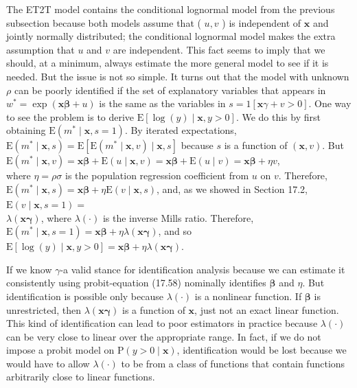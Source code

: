 \documentclass[10pt]{article}
\begin{document}
The ET2T model contains the conditional lognormal model from the previous subsection because both models assume that ( $u, v$ ) is independent of $\mathbf{x}$ and jointly normally distributed; the conditional lognormal model makes the extra assumption that $u$ and $v$ are independent. This fact seems to imply that we should, at a minimum, always estimate the more general model to see if it is needed. But the issue is not so simple. It turns out that the model with unknown $\rho$ can be poorly identified if the set of explanatory variables that appears in $w^{*}=\exp (\mathbf{x} \boldsymbol{\beta}+u)$ is the same as the variables in $s=1[\mathbf{x} \gamma+v>0]$. One way to see the problem is to derive $\mathrm{E}[\log (y) \mid \mathbf{x}, y>0]$. We do this by first obtaining $\mathrm{E}\left(m^{*} \mid \mathbf{x}, s=1\right)$. By iterated expectations, $\mathrm{E}\left(m^{*} \mid \mathbf{x}, s\right)= \mathrm{E}\left[\mathrm{E}\left(m^{*} \mid \mathbf{x}, v\right) \mid \mathbf{x}, s\right]$ because $s$ is a function of $(\mathbf{x}, v)$. But\\
$\mathrm{E}\left(m^{*} \mid \mathbf{x}, v\right)=\mathbf{x} \boldsymbol{\beta}+\mathrm{E}(u \mid \mathbf{x}, v)=\mathbf{x} \boldsymbol{\beta}+\mathrm{E}(u \mid v)=\mathbf{x} \boldsymbol{\beta}+\eta v$,\\
where $\eta=\rho \sigma$ is the population regression coefficient from $u$ on $v$. Therefore, $\mathrm{E}\left(m^{*} \mid \mathbf{x}, s\right)=\mathbf{x} \boldsymbol{\beta}+\eta \mathrm{E}(v \mid \mathbf{x}, s)$, and, as we showed in Section 17.2, $\mathrm{E}(v \mid \mathbf{x}, s=1)=$\\
$\lambda(\mathbf{x} \boldsymbol{\gamma})$, where $\lambda(\cdot)$ is the inverse Mills ratio. Therefore, $\mathrm{E}\left(m^{*} \mid \mathbf{x}, s=1\right)=\mathbf{x} \boldsymbol{\beta}+\eta \lambda(\mathbf{x} \boldsymbol{\gamma})$, and so\\
$\mathrm{E}[\log (y) \mid \mathbf{x}, y>0]=\mathbf{x} \boldsymbol{\beta}+\eta \lambda(\mathbf{x} \boldsymbol{\gamma})$.

If we know $\gamma$-a valid stance for identification analysis because we can estimate it consistently using probit-equation (17.58) nominally identifies $\boldsymbol{\beta}$ and $\eta$. But identification is possible only because $\lambda(\cdot)$ is a nonlinear function. If $\boldsymbol{\beta}$ is unrestricted, then $\lambda(\mathbf{x} \boldsymbol{\gamma})$ is a function of $\mathbf{x}$, just not an exact linear function. This kind of identification can lead to poor estimators in practice because $\lambda(\cdot)$ can be very close to linear over the appropriate range. In fact, if we do not impose a probit model on $\mathrm{P}(y>0 \mid \mathbf{x})$, identification would be lost because we would have to allow $\lambda(\cdot)$ to be from a class of functions that contain functions arbitrarily close to linear functions.
\end{document}
